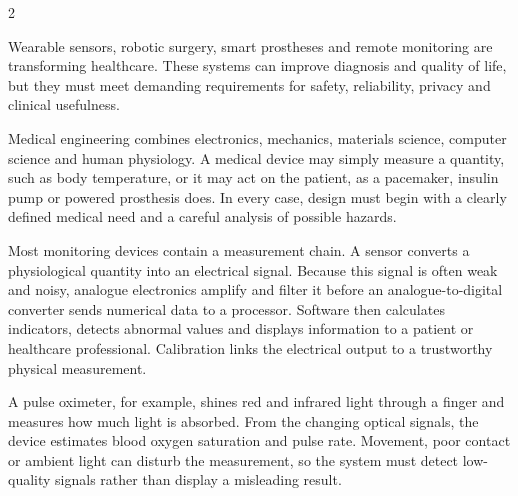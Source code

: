 

\begin{multicols}{2}
\begin{engineeringnews}
Wearable sensors, robotic surgery, smart prostheses and remote monitoring are transforming healthcare. These systems can improve diagnosis and quality of life, but they must meet demanding requirements for safety, reliability, privacy and clinical usefulness.
\end{engineeringnews}

\begin{ecarticle}
Medical engineering combines electronics, mechanics, materials science, computer science and human physiology. A medical device may simply measure a quantity, such as body temperature, or it may act on the patient, as a pacemaker, insulin pump or powered prosthesis does. In every case, design must begin with a clearly defined medical need and a careful analysis of possible hazards.

Most monitoring devices contain a measurement chain. A sensor converts a physiological quantity into an electrical signal. Because this signal is often weak and noisy, analogue electronics amplify and filter it before an analogue-to-digital converter sends numerical data to a processor. Software then calculates indicators, detects abnormal values and displays information to a patient or healthcare professional. Calibration links the electrical output to a trustworthy physical measurement.

A pulse oximeter, for example, shines red and infrared light through a finger and measures how much light is absorbed. From the changing optical signals, the device estimates blood oxygen saturation and pulse rate. Movement, poor contact or ambient light can disturb the measurement, so the system must detect low-quality signals rather than display a misleading result.


\end{ecarticle}
\end{multicols}
